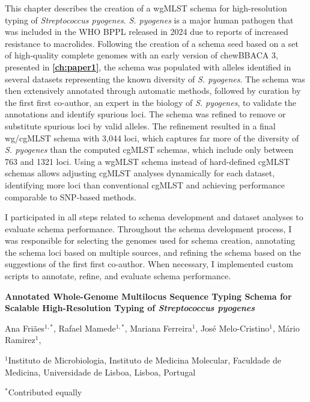 This chapter describes the creation of a \ac{wgMLST} schema for high-resolution typing of \textit{Streptococcus pyogenes}. \textit{S. pyogenes} is a major human pathogen that was included in the \ac{WHO} \ac{BPPL} released in 2024 due to reports of increased resistance to macrolides. Following the creation of a schema seed based on a set of high-quality complete genomes with an early version of chewBBACA 3, presented in \textbf{\autoref{ch:paper1}}, the schema was populated with alleles identified in several datasets representing the known diversity of \textit{S. pyogenes}. The schema was then extensively annotated through automatic methods, followed by curation by the first first co-author, an expert in the biology of \textit{S. pyogenes}, to validate the annotations and identify spurious loci. The schema was refined to remove or substitute spurious loci by valid alleles. The refinement resulted in a final \ac{wg/cgMLST} schema with 3,044 loci, which captures far more of the diversity of \textit{S. pyogenes} than the computed \ac{cgMLST} schemas, which include only between 763 and 1321 loci. Using a \ac{wgMLST} schema instead of hard-defined \ac{cgMLST} schemas allows adjusting \ac{cgMLST} analyses dynamically for each dataset, identifying more loci than conventional \ac{cgMLST} and achieving performance comparable to \ac{SNP}-based methods.

I participated in all steps related to schema development and dataset analyses to evaluate schema performance. Throughout the schema development process, I was responsible for selecting the genomes used for schema creation, annotating the schema loci based on multiple sources, and refining the schema based on the suggestions of the first first co-author. When necessary, I implemented custom scripts to annotate, refine, and evaluate schema performance.

\newpage 

\begin{center}
\large
\textbf{Annotated Whole-Genome Multilocus Sequence Typing Schema for Scalable High-Resolution Typing of \textit{Streptococcus pyogenes}}
\end{center}

Ana Friães$^{1,*}$, 
Rafael Mamede$^{1,*}$, 
Mariana Ferreira$^1$,
José Melo-Cristino$^1$, 
Mário Ramirez$^1$,

$^1$Instituto de Microbiologia, Instituto de Medicina Molecular, Faculdade de Medicina, Universidade de Lisboa, Lisboa, Portugal 

$^*$Contributed equally

